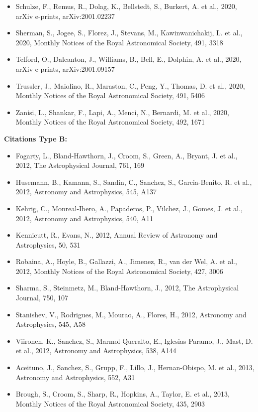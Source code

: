 \documentclass{letter}
\begin{document}
\begin{enumerate}
\begin{itemize}
\item Schulze, F., Remus, R., Dolag, K., Bellstedt, S., Burkert, A. et al., 2020, arXiv e-prints, arXiv:2001.02237
\item Sherman, S., Jogee, S., Florez, J., Stevans, M., Kawinwanichakij, L. et al., 2020, Monthly Notices of the Royal Astronomical Society, 491, 3318
\item Telford, O., Dalcanton, J., Williams, B., Bell, E., Dolphin, A. et al., 2020, arXiv e-prints, arXiv:2001.09157
\item Trussler, J., Maiolino, R., Maraston, C., Peng, Y., Thomas, D. et al., 2020, Monthly Notices of the Royal Astronomical Society, 491, 5406
\item Zanisi, L., Shankar, F., Lapi, A., Menci, N., Bernardi, M. et al., 2020, Monthly Notices of the Royal Astronomical Society, 492, 1671
\end{itemize}
{\bf Citations Type B:}
\begin{itemize}
\item Fogarty, L., Bland-Hawthorn, J., Croom, S., Green, A., Bryant, J. et al., 2012, The Astrophysical Journal, 761, 169
\item Husemann, B., Kamann, S., Sandin, C., Sanchez, S., Garcia-Benito, R. et al., 2012, Astronomy and Astrophysics, 545, A137
\item Kehrig, C., Monreal-Ibero, A., Papaderos, P., Vilchez, J., Gomes, J. et al., 2012, Astronomy and Astrophysics, 540, A11
\item Kennicutt, R., Evans, N., 2012, Annual Review of Astronomy and Astrophysics, 50, 531
\item Robaina, A., Hoyle, B., Gallazzi, A., Jimenez, R., van der Wel, A. et al., 2012, Monthly Notices of the Royal Astronomical Society, 427, 3006
\item Sharma, S., Steinmetz, M., Bland-Hawthorn, J., 2012, The Astrophysical Journal, 750, 107
\item Stanishev, V., Rodrigues, M., Mourao, A., Flores, H., 2012, Astronomy and Astrophysics, 545, A58
\item Viironen, K., Sanchez, S., Marmol-Queralto, E., Iglesias-Paramo, J., Mast, D. et al., 2012, Astronomy and Astrophysics, 538, A144
\item Aceituno, J., Sanchez, S., Grupp, F., Lillo, J., Hernan-Obispo, M. et al., 2013, Astronomy and Astrophysics, 552, A31
\item Brough, S., Croom, S., Sharp, R., Hopkins, A., Taylor, E. et al., 2013, Monthly Notices of the Royal Astronomical Society, 435, 2903

\end{itemize}
\end{enumerate}
\end{document}
